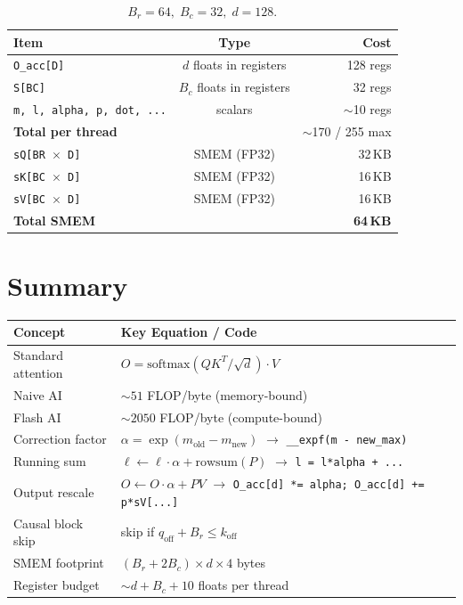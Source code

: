 \documentclass[11pt, letterpaper]{article}
\begin{document}
\begin{table}[h]
\centering
\begin{tabular}{@{}lcr@{}}
\toprule
\textbf{Item} & \textbf{Type} & \textbf{Cost} \\
\midrule
\texttt{O\_acc[D]} & $d$ floats in registers         & 128 regs \\
\texttt{S[BC]}     & $B_c$ floats in registers        & 32 regs \\
\texttt{m, l, alpha, p, dot, ...} & scalars          & $\sim$10 regs \\
\midrule
\textbf{Total per thread} & & $\sim$170 / 255 max \\
\midrule
\texttt{sQ[BR $\times$ D]}     & SMEM (FP32)    & 32\,KB \\
\texttt{sK[BC $\times$ D]}     & SMEM (FP32)    & 16\,KB \\
\texttt{sV[BC $\times$ D]}     & SMEM (FP32)    & 16\,KB \\
\midrule
\textbf{Total SMEM} & & \textbf{64\,KB} \\
\bottomrule
\end{tabular}
\caption*{$B_r = 64, \; B_c = 32, \; d = 128$.}
\end{table}

\section{Summary}

\begin{table}[h]
\centering
\begin{tabular}{@{}ll@{}}
\toprule
\textbf{Concept} & \textbf{Key Equation / Code} \\
\midrule
Standard attention     & $O = \text{softmax}(QK^T / \sqrt{d}) \cdot V$ \\
Naive AI               & $\sim 51$ FLOP/byte (memory-bound) \\
Flash AI               & $\sim 2050$ FLOP/byte (compute-bound) \\
Correction factor      & $\alpha = \exp(m_{\text{old}} - m_{\text{new}})$ \;\;$\to$\;\; \texttt{\_\_expf(m - new\_max)} \\
Running sum            & $\ell \leftarrow \ell \cdot \alpha + \text{rowsum}(P)$ \;\;$\to$\;\; \texttt{l = l*alpha + ...} \\
Output rescale         & $O \leftarrow O \cdot \alpha + P V$ \;\;$\to$\;\; \texttt{O\_acc[d] *= alpha; O\_acc[d] += p*sV[...]} \\
Causal block skip      & skip if $q_{\text{off}} + B_r \leq k_{\text{off}}$ \\
SMEM footprint         & $(B_r + 2B_c) \times d \times 4$ bytes \\
Register budget        & $\sim d + B_c + 10$ floats per thread \\
\bottomrule
\end{tabular}
\end{table}
\end{document}
